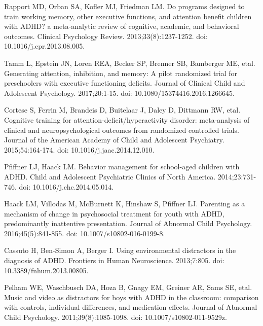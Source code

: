 \documentclass[10pt,letterpaper]{article}
\begin{document}
{\begin{thebibliography}{vancouver.bst}
Rapport MD, Orban SA, Kofler MJ, Friedman LM.
\newblock Do programs designed to train working memory, other executive
  functions, and attention benefit children with {ADHD}? a meta-analytic review
  of cognitive, academic, and behavioral outcomes.
\newblock Clinical Psychology Review. 2013;33(8):1237-1252. doi: 10.1016/j.cpr.2013.08.005.


Tamm L, Epstein JN, Loren REA, Becker SP, Brenner SB, Bamberger ME, etal.
\newblock Generating attention, inhibition, and memory: A pilot randomized
  trial for preschoolers with executive functioning deficits.
\newblock Journal of Clinical Child and Adolescent Psychology. 2017;20:1-15. doi: 10.1080/15374416.2016.1266645. 


Cortese S, Ferrin M, Brandeis D, Buitelaar J, Daley D,
  Dittmann RW, etal.
\newblock Cognitive training for attention-deficit/hyperactivity disorder:
  meta-analysis of clinical and neuropsychological outcomes from randomized
  controlled trials.
\newblock Journal of the American Academy of Child and Adolescent
  Psychiatry. 2015;54:164-174. doi: 10.1016/j.jaac.2014.12.010.


Pfiffner LJ, Haack LM.
\newblock Behavior management for school-aged children with {ADHD}.
\newblock Child and Adolescent Psychiatric Clinics of North America. 2014;23:731-746. doi: 10.1016/j.chc.2014.05.014.


Haack LM, Villodas M, McBurnett K, Hinshaw S, Pfiffner LJ.
\newblock Parenting as a mechanism of change in psychosocial treatment for
  youth with {ADHD}, predominantly inattentive presentation.
\newblock Journal of Abnormal Child Psychology. 2016;45(5):841-855. doi: 10.1007/s10802-016-0199-8.



Cassuto H, Ben-Simon A, Berger I.
\newblock Using environmental distractors in the diagnosis of {ADHD}.
\newblock Frontiers in Human Neuroscience. 2013;7:805. doi: 10.3389/fnhum.2013.00805.


Pelham WE, Waschbusch DA, Hoza B, Gnagy EM,
  Greiner AR, Sams SE, etal. 
  \newblock Music and video as distractors for boys with {ADHD} in the classroom:
  comparison with controls, individual differences, and medication effects.
\newblock Journal of Abnormal Child Psychology. 2011;39(8):1085-1098. doi: 10.1007/s10802-011-9529\-z.



%
%




\end{thebibliography}}
\end{document}

